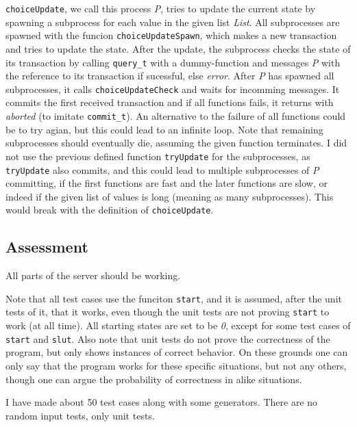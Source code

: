 \documentclass[a4paper, 10pt]{article}
\begin{document}
\texttt{choiceUpdate}, we call this process \textit{P}, tries to update the current state by spawning a subprocess for each value in the given list \textit{List}. All subprocesses are spawned with the funcion \texttt{choiceUpdateSpawn}, which makes a new transaction and tries to update the state. After the update, the subprocess checks the state of its transaction by calling \texttt{query\_t} with a dummy-function and messages \textit{P} with the reference to its transaction if sucessful, else \textit{error}.
After \textit{P} has spawned all subprocesses, it calls \texttt{choiceUpdateCheck} and waits for incomming messages. It commits the first received transaction and if all functions fails, it returns with \textit{aborted} (to imitate \texttt{commit\_t}). An alternative to the failure of all functions could be to try agian, but this could lead to an infinite loop. Note that remaining subprocesses should eventually die, assuming the given function terminates.
I did not use the previous defined function \texttt{tryUpdate} for the subprocesses, as \texttt{tryUpdate} also commits, and this could lead to multiple subprocesses of \textit{P} committing, if the first functions are fast and the later functions are slow, or indeed if the given list of values is long (meaning as many subprocesses). This would break with the definition of \texttt{choiceUpdate}.

\subsection{Assessment}
All parts of the server should be working.

Note that all test cases use the funciton \texttt{start}, and it is assumed, after the unit tests of it, that it works, even though the unit tests are not proving \texttt{start} to work (at all time). All starting states are set to be \textit{0}, except for some test cases of \texttt{start} and \texttt{slut}.
Also note that unit tests do not prove the correctness of the program, but only shows instances of correct behavior. On these grounds one can only say that the program works for these specific situations, but not any others, though one can argue the probability of correctness in alike situations.

I have made about 50 test cases along with some generators. There are no random input tests, only unit tests.
\end{document}
